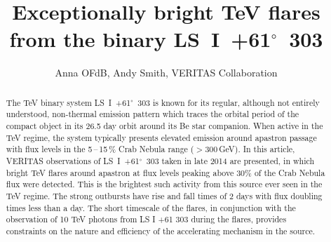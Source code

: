 \documentclass[preprint2]{aastex}
\newcommand{\tapp}{\raisebox{0.5ex}{\texttildelow}}
\newcommand{\lsi}{LS~I~+61$^{\circ}$~303}
\newcommand{\gev}{\,GeV}
\begin{document}

\title{Exceptionally bright TeV flares from the binary \lsi{}}


\author{
Anna OFdB,
Andy Smith,
VERITAS Collaboration
}




\begin{abstract}
The TeV binary system \lsi{} is known for its regular, although not entirely understood, non-thermal emission pattern which traces the orbital period of the compact object in its 26.5 day orbit around its Be star companion. When active in the TeV regime, the system typically presents elevated emission around apastron passage with flux levels in the 5\,--\,15\,\% Crab Nebula range ($>300$\gev{}). In this article, VERITAS observations of \lsi{} taken in late 2014 are presented, in which bright TeV flares around apastron at flux levels peaking above $30\%$ of the Crab Nebula flux were detected. This is the brightest such activity from this source ever seen in the TeV regime. The strong outbursts have rise and fall times of \tapp{}$2$ days with flux doubling times less than a day. The short timescale of the flares, in conjunction with the observation of 10 TeV photons from LS I +61 303 during the flares, provides constraints on the nature and efficiency of the accelerating mechanism in the source.
\end{abstract}
\end{document}
